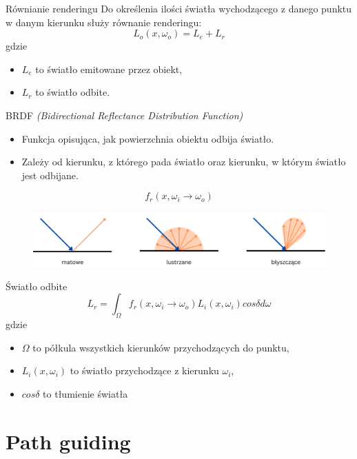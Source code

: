 \documentclass{beamer}
\begin{document}
\begin{frame}{Równianie renderingu}
Do określenia ilości światła wychodzącego z danego punktu w danym kierunku służy równanie renderingu:
$$ L_o(x, \omega_o) = L_e + L_r $$
gdzie
\begin{itemize}
    \item $L_e$ to światło emitowane przez obiekt,
    \item $L_r$ to światło odbite.
\end{itemize}
\end{frame}

\begin{frame}{BRDF \it{(Bidirectional Reflectance Distribution Function)}}
    \begin{itemize}
        \item Funkcja opisująca, jak powierzchnia obiektu odbija światło.
        \item Zależy od kierunku, z którego pada światło oraz kierunku, w którym światło jest odbijane.
    \end{itemize}
$$ f_r(x, \omega_i \rightarrow \omega_o) $$
\begin{figure}
    \centering
    \includegraphics[width=1\linewidth]{img/surfaces.png}
    \label{fig:enter-label}
\end{figure}
\end{frame}

\begin{frame}{Światło odbite}
    $$ L_r = \int_{\Omega}f_r(x, \omega_i \rightarrow \omega_o)L_i(x, \omega_i)cos\delta d\omega $$
gdzie
\begin{itemize}
    \item $\Omega$ to półkula wszystkich kierunków przychodzących do punktu,
    \item $L_i(x, \omega_i)$ to światło przychodzące z kierunku $\omega_i$,
    \item $cos\delta$ to tłumienie światła
\end{itemize}
\end{frame}

\section{Path guiding}
\end{document}
